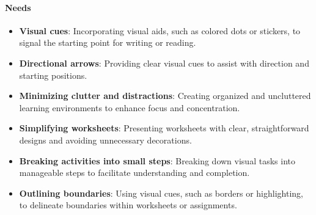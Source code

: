 \paragraph{Needs}
\begin{itemize}
    \item \textbf{Visual cues}: Incorporating visual aids, such as colored dots or stickers, to signal the starting point for writing or reading.
    \item \textbf{Directional arrows}: Providing clear visual cues to assist with direction and starting positions.
    \item \textbf{Minimizing clutter and distractions}: Creating organized and uncluttered learning environments to enhance focus and concentration.
    \item \textbf{Simplifying worksheets}: Presenting worksheets with clear, straightforward designs and avoiding unnecessary decorations.
    \item \textbf{Breaking activities into small steps}: Breaking down visual tasks into manageable steps to facilitate understanding and completion.
    \item \textbf{Outlining boundaries}: Using visual cues, such as borders or highlighting, to delineate boundaries within worksheets or assignments.
\end{itemize}